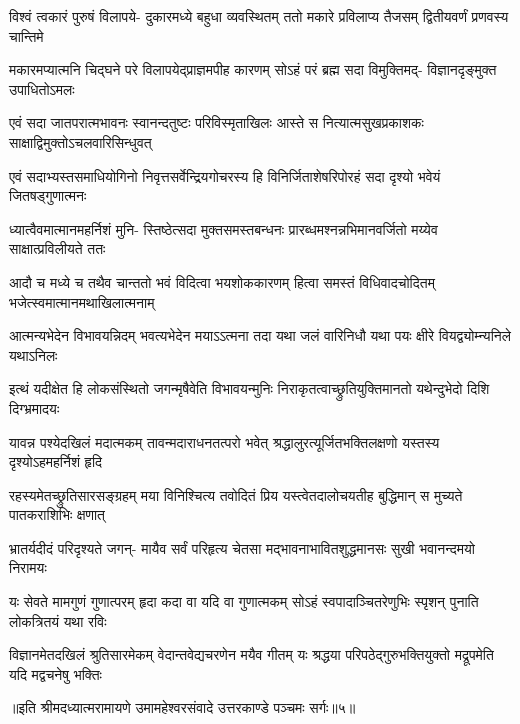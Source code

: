 \fourlineindentedshloka
{विश्वं त्वकारं पुरुषं विलापये-}
{दुकारमध्ये बहुधा व्यवस्थितम्}
{ततो मकारे प्रविलाप्य तैजसम्}
{द्वितीयवर्णं प्रणवस्य चान्तिमे} %

\fourlineindentedshloka
{मकारमप्यात्मनि चिद्घने परे}
{विलापयेद्प्राज्ञमपीह कारणम्}
{सोऽहं परं ब्रह्म सदा विमुक्तिमद्-}
{विज्ञानदृङ्मुक्त उपाधितोऽमलः} %

\fourlineindentedshloka
{एवं सदा जातपरात्मभावनः}
{स्वानन्दतुष्टः परिविस्मृताखिलः}
{आस्ते स नित्यात्मसुखप्रकाशकः}
{साक्षाद्विमुक्तोऽचलवारिसिन्धुवत्} %

\fourlineindentedshloka
{एवं सदाभ्यस्तसमाधियोगिनो}
{निवृत्तसर्वेन्द्रियगोचरस्य हि}
{विनिर्जिताशेषरिपोरहं सदा}
{दृश्यो भवेयं जितषड्गुणात्मनः} %

\fourlineindentedshloka
{ध्यात्वैवमात्मानमहर्निशं मुनि-}
{स्तिष्ठेत्सदा मुक्तसमस्तबन्धनः}
{प्रारब्धमश्नन्नभिमानवर्जितो}
{मय्येव साक्षात्प्रविलीयते ततः} %

\fourlineindentedshloka
{आदौ च मध्ये च तथैव चान्ततो}
{भवं विदित्वा भयशोककारणम्}
{हित्वा समस्तं विधिवादचोदितम्}
{भजेत्स्वमात्मानमथाखिलात्मनाम्} %

\fourlineindentedshloka
{आत्मन्यभेदेन विभावयन्निदम्}
{भवत्यभेदेन मयाऽऽत्मना तदा}
{यथा जलं वारिनिधौ यथा पयः}
{क्षीरे वियद्व्योम्न्यनिले यथाऽनिलः} %

\fourlineindentedshloka
{इत्थं यदीक्षेत हि लोकसंस्थितो}
{जगन्मृषैवेति विभावयन्मुनिः}
{निराकृतत्वाच्छ्रुतियुक्तिमानतो}
{यथेन्दुभेदो दिशि दिग्भ्रमादयः} %

\fourlineindentedshloka
{यावन्न पश्येदखिलं मदात्मकम्}
{तावन्मदाराधनतत्परो भवेत्}
{श्रद्धालुरत्यूर्जितभक्तिलक्षणो}
{यस्तस्य दृश्योऽहमहर्निशं हृदि} %

\fourlineindentedshloka
{रहस्यमेतच्छ्रुतिसारसङ्ग्रहम्}
{मया विनिश्चित्य तवोदितं प्रिय}
{यस्त्वेतदालोचयतीह बुद्धिमान्}
{स मुच्यते पातकराशिभिः क्षणात्} %

\fourlineindentedshloka
{भ्रातर्यदीदं परिदृश्यते जगन्-}
{मायैव सर्वं परिहृत्य चेतसा}
{मद्भावनाभावितशुद्धमानसः}
{सुखी भवानन्दमयो निरामयः} %

\fourlineindentedshloka
{यः सेवते मामगुणं गुणात्परम्}
{हृदा कदा वा यदि वा गुणात्मकम्}
{सोऽहं स्वपादाञ्चितरेणुभिः स्पृशन्}
{पुनाति लोकत्रितयं यथा रविः} %

\fourlineindentedshloka
{विज्ञानमेतदखिलं श्रुतिसारमेकम्}
{वेदान्तवेद्यचरणेन मयैव गीतम्}
{यः श्रद्धया परिपठेद्गुरुभक्तियुक्तो}
{मद्रूपमेति यदि मद्वचनेषु भक्तिः} %

{॥इति श्रीमदध्यात्मरामायणे उमामहेश्वरसंवादे उत्तरकाण्डे
पञ्चमः सर्गः॥५॥}




